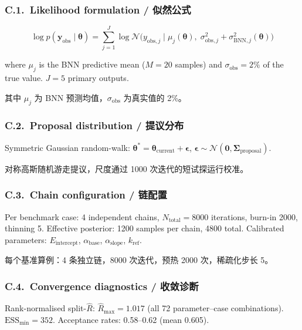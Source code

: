\documentclass[11pt,a4paper]{article}
\newcommand{\Eint}{\ensuremath{E_{\mathrm{intercept}}}}
\newcommand{\abase}{\ensuremath{\alpha_{\mathrm{base}}}}
\newcommand{\aslope}{\ensuremath{\alpha_{\mathrm{slope}}}}
\newcommand{\kref}{\ensuremath{k_{\mathrm{ref}}}}
\begin{document}
\subsubsection*{C.1.~Likelihood formulation / 似然公式}

\begin{equation}
\log p(\mathbf{y}_\mathrm{obs} \mid \boldsymbol{\theta})
= \sum_{j=1}^{J} \log \mathcal{N}\bigl(y_{\mathrm{obs},j} \mid
  \mu_j(\boldsymbol{\theta}),\;
  \sigma_{\mathrm{obs},j}^2 + \sigma_{\mathrm{BNN},j}^2(\boldsymbol{\theta})\bigr)
\end{equation}

where $\mu_j$ is the BNN predictive mean ($M = 20$ samples) and
$\sigma_\mathrm{obs} = 2\%$ of the true value. $J = 5$ primary outputs.

其中 $\mu_j$ 为 BNN 预测均值，$\sigma_\mathrm{obs}$ 为真实值的 2\%。

\subsubsection*{C.2.~Proposal distribution / 提议分布}

Symmetric Gaussian random-walk:
$\boldsymbol{\theta}^* = \boldsymbol{\theta}_\mathrm{current} +
\boldsymbol{\epsilon}$,
$\boldsymbol{\epsilon} \sim \mathcal{N}(\mathbf{0},
\boldsymbol{\Sigma}_\mathrm{proposal})$.

对称高斯随机游走提议，尺度通过 1000 次迭代的短试探运行校准。

\subsubsection*{C.3.~Chain configuration / 链配置}

Per benchmark case: 4 independent chains, $N_\mathrm{total} = 8000$
iterations, burn-in 2000, thinning 5. Effective posterior: 1200 samples
per chain, 4800 total. Calibrated parameters: \Eint{}, \abase{},
\aslope{}, \kref{}.

每个基准算例：4 条独立链，8000 次迭代，预热 2000 次，稀疏化步长 5。

\subsubsection*{C.4.~Convergence diagnostics / 收敛诊断}

Rank-normalised split-$\hat{R}$: $\hat{R}_\mathrm{max} = 1.017$ (all
72 parameter--case combinations). $\mathrm{ESS}_\mathrm{min} = 352$.
Acceptance rates: 0.58--0.62 (mean 0.605).
\end{document}
